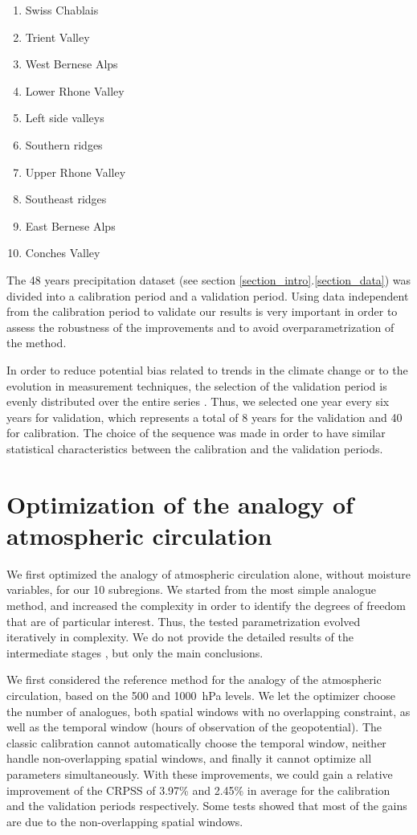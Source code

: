 \documentclass{ametsoc}
\begin{document}
\begin{enumerate}
	\setlength\itemsep{-4px}
	\item Swiss Chablais
	\item Trient Valley
	\item West Bernese Alps
	\item Lower Rhone Valley
	\item Left side valleys
	\item Southern ridges
	\item Upper Rhone Valley
	\item Southeast ridges
	\item East Bernese Alps
	\item Conches Valley
\end{enumerate}

The 48 years precipitation dataset (see section \ref{section_intro}.\ref{section_data}) was divided into a calibration period and a validation period. Using data independent from the calibration period to validate our results is very important in order to assess the robustness of the improvements and to avoid overparametrization of the method.

In order to reduce potential bias related to trends in the climate change or to the evolution in measurement techniques, the selection of the validation period is evenly distributed over the entire series \citep{BenDaoud2010}. Thus, we selected one year every six years for validation, which represents a total of 8 years for the validation and 40 for calibration. The choice of the sequence was made in order to have similar statistical characteristics between the calibration and the validation periods.


\section{Optimization of the analogy of atmospheric circulation}

We first optimized the analogy of atmospheric circulation alone, without moisture variables, for our 10 subregions. We started from the most simple analogue method, and increased the complexity in order to identify the degrees of freedom that are of particular interest. Thus, the tested parametrization evolved iteratively in complexity. We do not provide the detailed results of the intermediate stages \citep[see][for the details]{Horton2012a}, but only the main conclusions.

We first considered the reference method for the analogy of the atmospheric circulation, based on the 500 and 1000~hPa levels. We let the optimizer choose the number of analogues, both spatial windows with no overlapping constraint, as well as the temporal window (hours of observation of the geopotential). The classic calibration cannot automatically choose the temporal window, neither handle non-overlapping spatial windows, and finally it cannot optimize all parameters simultaneously. With these improvements, we could gain a relative improvement of the CRPSS of 3.97\% and 2.45\% in average for the calibration and the validation periods respectively. Some tests showed that most of the gains are due to the non-overlapping spatial windows.
\end{document}
